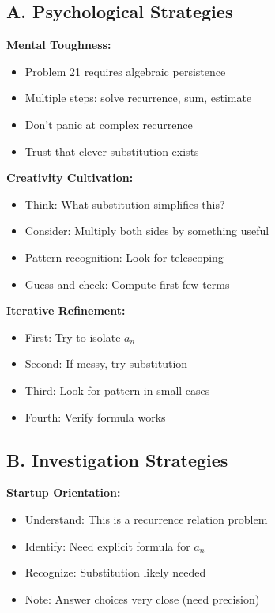 \documentclass[12pt]{article}
\begin{document}
\begin{strategicbox}

\subsection*{A. Psychological Strategies}

\textbf{Mental Toughness:}
\begin{itemize}
    \item Problem 21 requires algebraic persistence
    \item Multiple steps: solve recurrence, sum, estimate
    \item Don't panic at complex recurrence
    \item Trust that clever substitution exists
\end{itemize}

\textbf{Creativity Cultivation:}
\begin{itemize}
    \item Think: What substitution simplifies this?
    \item Consider: Multiply both sides by something useful
    \item Pattern recognition: Look for telescoping
    \item Guess-and-check: Compute first few terms
\end{itemize}

\textbf{Iterative Refinement:}
\begin{itemize}
    \item First: Try to isolate $a_n$
    \item Second: If messy, try substitution
    \item Third: Look for pattern in small cases
    \item Fourth: Verify formula works
\end{itemize}

\subsection*{B. Investigation Strategies}

\textbf{Startup Orientation:}
\begin{itemize}
    \item Understand: This is a recurrence relation problem
    \item Identify: Need explicit formula for $a_n$
    \item Recognize: Substitution likely needed
    \item Note: Answer choices very close (need precision)
\end{itemize}


\end{strategicbox}
\end{document}
